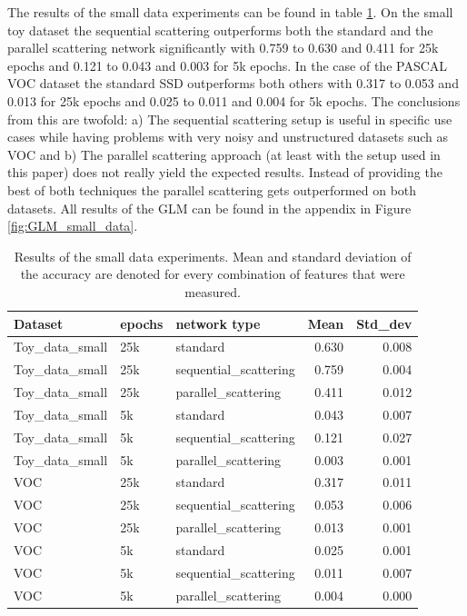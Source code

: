 The results of the small data experiments can be found in table \ref{table:small_data_experiments}. On the small toy dataset the sequential scattering outperforms both the standard and the parallel scattering network significantly with 0.759 to 0.630 and 0.411 for 25k epochs and 0.121 to 0.043 and 0.003 for 5k epochs. In the case of the PASCAL VOC dataset the standard SSD outperforms both others with 0.317 to 0.053 and 0.013 for 25k epochs and 0.025 to 0.011 and 0.004 for 5k epochs. The conclusions from this are twofold: a) The sequential scattering setup is useful in specific use cases while having problems with very noisy and unstructured datasets such as VOC and b) The parallel scattering approach (at least with the setup used in this paper) does not really yield the expected results. Instead of providing the best of both techniques the parallel scattering gets outperformed on both datasets. All results of the GLM can be found in the appendix in Figure \ref{fig:GLM_small_data}. 


\begin{table}[!htb]
	\centering
	\caption{Results of the small data experiments. Mean and standard deviation of the accuracy are denoted for every combination of features that were measured.}
	\begin{tabular}{lllrr}
		\toprule
		Dataset & epochs &           network type &   Mean &  Std\_dev \\
		\midrule
		Toy\_data\_small &    25k &               standard &  0.630 &    0.008 \\
		Toy\_data\_small &    25k &  sequential\_scattering &  0.759 &    0.004 \\
		Toy\_data\_small &    25k &    parallel\_scattering &  0.411 &    0.012 \\
		Toy\_data\_small &     5k &               standard &  0.043 &    0.007 \\
		Toy\_data\_small &     5k &  sequential\_scattering &  0.121 &    0.027 \\
		Toy\_data\_small &     5k &    parallel\_scattering &  0.003 &    0.001 \\
		\hdashline
		VOC &    25k &               standard &  0.317 &    0.011 \\
		VOC &    25k &  sequential\_scattering &  0.053 &    0.006 \\
		VOC &    25k &    parallel\_scattering &  0.013 &    0.001 \\
		VOC &     5k &               standard &  0.025 &    0.001 \\
		VOC &     5k &  sequential\_scattering &  0.011 &    0.007 \\
		VOC &     5k &    parallel\_scattering &  0.004 &    0.000 \\
		\bottomrule
	\end{tabular}
	\label{table:small_data_experiments}
\end{table}

